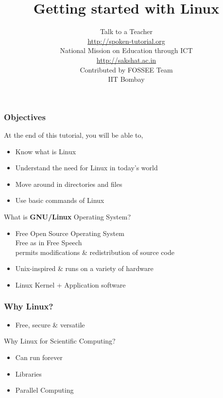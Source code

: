 \documentclass[17pt,compress]{beamer}
\author[FOSSEE]{}
\institute[IIT Bombay]{}
\date[]{}
\begin{document}
\sffamily \bfseries
\title
[Getting started with Linux]
{Getting started with Linux}
\author
[FOSSEE]
{\small Talk to a Teacher\\{\color{blue}\url{http://spoken-tutorial.org}}\\\vspace{0.25cm}National Mission on Education
 through ICT\\{\color{blue}\url{ http://sakshat.ac.in}} \\ [1.65cm]
   Contributed by FOSSEE Team \\IIT Bombay  \\[0.3cm]
}

\begin{frame}
   \titlepage
\end{frame}

\begin{frame}
\frametitle{Objectives}
\label{sec-2}

At the end of this tutorial, you will be able to,
\begin{itemize}
\item Know what is Linux
\item Understand the need for Linux in today's world
\item Move around in directories and files
\item Use basic commands of Linux
\end{itemize}
\end{frame}

\begin{frame}[fragile]
  \begin{block}{What is \textbf{GNU/Linux} Operating System?}
    \begin{itemize}
    \item Free Open Source Operating System\\
      {\color{LimeGreen}{Free}} Free as in Free Speech\\
      {\color{LimeGreen}{Open-Source}} permits modifications \& redistribution of source code
      \item Unix-inspired \& runs on a variety of hardware
    \item Linux Kernel + Application software
    \end{itemize}
  \end{block}
\end{frame}

\begin{frame}[fragile]
  \frametitle{Why Linux?}
    \begin{itemize}
    \item Free, secure \& versatile
    \end{itemize}

    \begin{block}{Why Linux for Scientific Computing?}
      \begin{itemize}
        \item Can run forever
        \item Libraries
        \item Parallel Computing
      \end{itemize}
    \end{block}
\end{frame}
\end{document}
